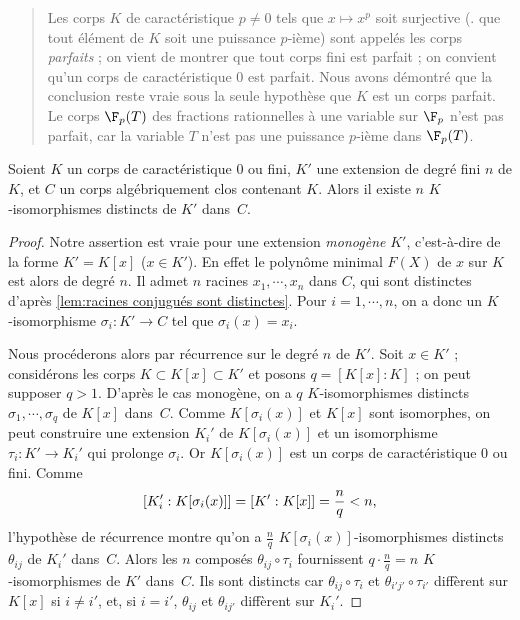 \documentclass[11pt, %
  title in boldface,
  theorem in new line,
  theorem numbering = section,
  number theorems separately,
  simple name,
]{beaulivre}
\begin{document}
    \begin{quote}
        Les corps \( K \) de caractéristique \( p \neq 0 \) tels que \( x \mapsto x^p \) soit surjective (\ie. que tout élément de \( K \) soit une puissance \( p \)‑ième) sont appelés les corps \emph{parfaits} ; on vient de montrer que tout corps fini est parfait ; on convient qu'un corps de caractéristique \( 0 \) est parfait. Nous avons démontré que la conclusion  reste vraie sous la seule hypothèse que \( K \) est un corps parfait. Le corps \( \F_p(T) \) des fractions rationnelles à une variable sur \( \F_p \) n'est pas parfait, car la variable \( T \) n'est pas une puissance \( p \)‑ième dans \( \F_p(T) \).
    \end{quote}

    \begin{theorem}\label{thm:nombre de prolongements et degré}
        Soient \( K \) un corps de caractéristique \( 0 \) ou fini, \( K' \) une extension de degré fini \( n \) de \( K \), et \( C \) un corps algébriquement clos contenant \( K \). Alors il existe \( n \) \( K \)‑isomorphismes distincts de \( K' \) dans~\( C \).
    \end{theorem}
    \begin{proof}
        Notre assertion est vraie pour une extension \emph{monogène} \( K' \), c'est-à-dire de la forme \( K' = K[x] \) (\( x \in K' \)). En effet le polynôme minimal \( F(X) \) de \( x \) sur \( K \) est alors de degré \( n \). Il admet \( n \) racines \( x_1, \cdots, x_n \) dans \( C \), qui sont distinctes d'après \cref{lem:racines conjugués sont distinctes}. Pour \( i = 1, \cdots, n \), on a donc un \( K \)‑isomorphisme \( \sigma_i \colon K' \to C \) tel que \( \sigma_i(x) = x_i \).

        Nous procéderons alors par récurrence sur le degré \( n \) de \( K' \). Soit \( x \in K' \) ;  considérons les corps \( K \subset K[x] \subset K' \) et posons \( q = [K[x]:K] \) ; on peut supposer \( q > 1 \). D'après le cas monogène, on a \( q \) \( K \)‑isomorphismes distincts \( \sigma_1, \cdots, \sigma_q \) de \( K[x] \) dans~\( C \). Comme \( K[\sigma_i(x)] \) et \( K[x] \) sont isomorphes, on peut construire une extension \( K_i' \) de \( K[\sigma_i(x)] \) et un isomorphisme \( \tau_i \colon K' \to K_i' \) qui prolonge \( \sigma_i \). Or \( K[\sigma_i(x)] \) est un corps de caractéristique \( 0 \) ou fini. Comme
        {\[\setlength{\abovedisplayskip}{.5\baselineskip}%
        \setlength{\belowdisplayskip}{.5\baselineskip}%
            [K_i' : K[\sigma_i(x)]] = [K' : K[x]] = \frac{n}{q} < n,
        \]}%
        l'hypothèse de récurrence montre qu'on a \( \frac{n}{q} \) \( K[\sigma_i(x)] \)‑isomorphismes distincts \( \theta_{ij} \) de \( K_i' \) dans~\( C \). Alors les \( n \) composés \( \theta_{ij} \circ \tau_i \) fournissent \( q \cdot \frac{n}{q} = n \) \( K \)‑isomorphismes de \( K' \) dans~\( C \). Ils sont distincts car \( \theta_{ij} \circ \tau_i \) et \( \theta_{i'j'} \circ \tau_{i'} \) diffèrent sur \( K[x] \) si \( i \neq i' \), et, si \( i = i' \), \( \theta_{ij} \) et \( \theta_{ij'} \) diffèrent sur \( K_i' \).
    \end{proof}
\end{document}

